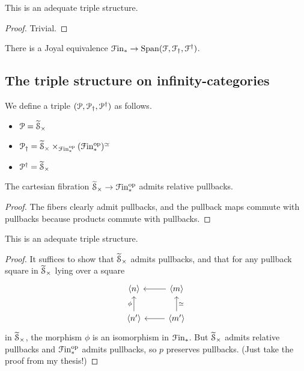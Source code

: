 \documentclass[main.tex]{subfiles}
\begin{document}
\begin{proposition}
  This is an adequate triple structure.
\end{proposition}
\begin{proof}
  Trivial.
\end{proof}

\begin{proposition}
  There is a Joyal equivalence $\mathcal{F}\mathrm{in}_{*} \to \mathrm{Span}(\mathcal{F}, \mathcal{F}_{\dagger}, \mathcal{F}^{\dagger})$.
\end{proposition}

\subsection{The triple structure on infinity-categories}
\label{ssc:the_triple_structure_on_categories}

We define a triple $(\mathcal{P}, \mathcal{P}_{\dagger}, \mathcal{P}^{\dagger})$ as follows.
\begin{itemize}
  \item $\mathcal{P} = \widetilde{\mathcal{S}}_{\times}$

  \item $\mathcal{P}_{\dagger} = \widetilde{\mathcal{S}}_{\times} \times_{\mathcal{F}\mathrm{in}_{*}^{\mathrm{op}}}(\mathcal{F}\mathrm{in}_{*}^{\mathrm{op}})^{\simeq}$

  \item $\mathcal{P}^{\dagger} = \widetilde{\mathcal{S}}_{\times}$
\end{itemize}

\begin{proposition}
  The cartesian fibration $\widetilde{\mathcal{S}}_{\times} \to \mathcal{F}\mathrm{in}_{*}^{\mathrm{op}}$ admits relative pullbacks.
\end{proposition}
\begin{proof}
  The fibers clearly admit pullbacks, and the pullback maps commute with pullbacks because products commute with pullbacks.
\end{proof}

\begin{proposition}
  This is an adequate triple structure.
\end{proposition}
\begin{proof}
  It suffices to show that $\widetilde{\mathcal{S}}_{\times}$ admits pullbacks, and that for any pullback square in $\widetilde{\mathcal{S}}_{\times}$ lying over a square
  \begin{equation*}
    \begin{tikzcd}
      \langle n \rangle
      & \langle m \rangle
      \arrow[l]
      \\
      \langle n' \rangle
      \arrow[u, "\phi"]
      & \langle m' \rangle
      \arrow[l]
      \arrow[u, swap, "\simeq"]
    \end{tikzcd}
  \end{equation*}
  in $\widetilde{\mathcal{S}}_{\times}$, the morphism $\phi$ is an isomorphism in $\mathcal{F}\mathrm{in}_{*}$. But $\widetilde{\mathcal{S}}_{\times}$ admits relative pullbacks and $\mathcal{F}\mathrm{in}_{*}^{\mathrm{op}}$ admits pullbacks, so $p$ preserves pullbacks. (Just take the proof from my thesis!)
\end{proof}
\end{document}
